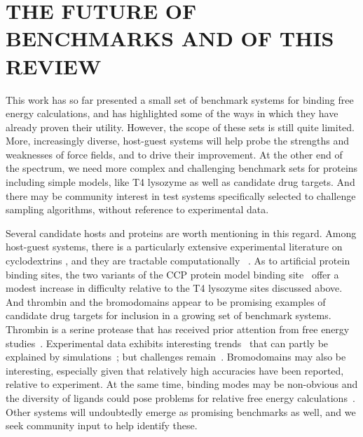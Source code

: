 \documentclass[aps,pre,twocolumn,nofootinbib,superscriptaddress,10pt, final,tightenlines]{revtex4-1}
\begin{document}
\section{THE FUTURE OF BENCHMARKS AND OF THIS REVIEW}
\label{sec:updates}
This work has so far presented a small set of benchmark systems for binding free energy calculations, and has highlighted some of the ways in which they have already proven their utility. 
However, the scope of these sets is still quite limited. 
More, increasingly diverse, host-guest systems will help probe the strengths and weaknesses of force fields, and to drive their improvement. 
At the other end of the spectrum, we need more complex and challenging benchmark sets for proteins including simple models, like T4 lysozyme as well as candidate drug targets. 
And there may be community interest in test systems specifically selected to challenge sampling algorithms, without reference to experimental data.

Several candidate hosts and proteins are worth mentioning in this regard. 
Among host-guest systems, there is a particularly extensive experimental literature on cyclodextrins \cite{godinez_thermodynamic_1997, rekharsky_complexation_1998}, and they are tractable computationally ~\cite{henriksen_computational_2015, wickstrom_parameterization_2016}. 
As to artificial protein binding sites, the two variants of the CCP protein model binding site~\cite{fitzgerald_ligand-gated_1996, banba_free_2000, banba_efficient_2000, rocklin_blind_2013, musah_artificial_2002, rosenfeld_excision_2002} offer a modest increase in difficulty relative to the T4 lysozyme sites discussed above. 
And thrombin and the bromodomains appear to be promising examples of candidate drug targets for inclusion in a growing set of benchmark systems. 
Thrombin is a serine protease that has received prior attention from free energy studies~\cite{wang_achieving_2012, schrodinger_accurate_2015, calabro_elucidation_2016}. 
Experimental data exhibits interesting trends~\cite{baum_non-additivity_2010} that can partly be explained by simulations~\cite{calabro_elucidation_2016}; but challenges remain~\cite{calabro_accelerating_2015}.
Bromodomains may also be interesting, especially given that relatively high accuracies have been reported, relative to experiment. 
At the same time, binding modes may be non-obvious and the diversity of ligands could pose problems for relative free energy calculations~\cite{aldeghi_accurate_2016}.
Other systems will undoubtedly emerge as promising benchmarks as well, and we seek community input to help identify these.
\end{document}
